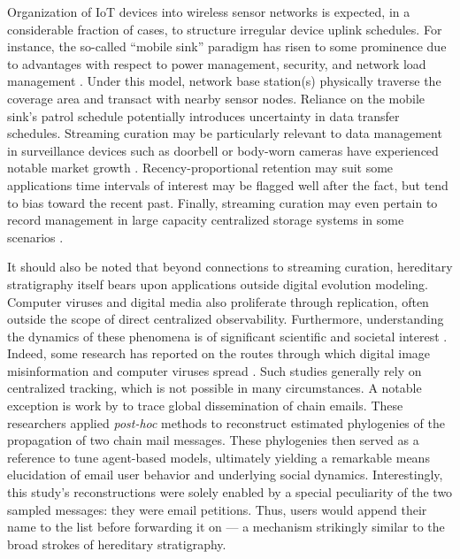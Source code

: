Organization of IoT devices into wireless sensor networks is expected, in a considerable fraction of cases, to structure irregular device uplink schedules.
For instance, the so-called ``mobile sink'' paradigm has risen to some prominence due to advantages with respect to power management, security, and network load management \citep{jain2022survey}.
Under this model, network base station(s) physically traverse the coverage area and transact with nearby sensor nodes.
Reliance on the mobile sink's patrol schedule potentially introduces uncertainty in data transfer schedules.
Streaming curation may be particularly relevant to data management in surveillance devices such as doorbell or body-worn cameras have experienced notable market growth \citep{calacci2022cop,lum2019research}.
Recency-proportional retention may suit some applications time intervals of interest may be flagged well after the fact, but tend to bias toward the recent past.
Finally, streaming curation may even pertain to record management in large capacity centralized storage systems in some scenarios \citep{bhat2018data}.

It should also be noted that beyond connections to streaming curation, hereditary stratigraphy itself bears upon applications outside digital evolution modeling.
Computer viruses and digital media also proliferate through replication, often outside the scope of direct centralized observability.
Furthermore, understanding the dynamics of these phenomena is of significant scientific and societal interest \citep{aslan2020comprehensive,dupuis2019spread,ling2021dissecting}.
Indeed, some research has reported on the routes through which digital image misinformation and computer viruses spread \citep{friggeri2014rumor,cohen1987computer}.
Such studies generally rely on centralized tracking, which is not possible in many circumstances.
A notable exception is work by \cite{libennowell2008tracing} to trace global dissemination of chain emails.
These researchers applied \textit{post-hoc} methods to reconstruct estimated phylogenies of the propagation of two chain mail messages.
These phylogenies then served as a reference to tune agent-based models, ultimately yielding a remarkable means elucidation of email user behavior and underlying social dynamics.
Interestingly, this study's reconstructions were solely enabled by a special peculiarity of the two sampled messages: they were email petitions.
Thus, users would append their name to the list before forwarding it on --- a mechanism strikingly similar to the broad strokes of hereditary stratigraphy.

